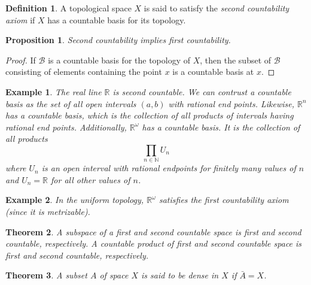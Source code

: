 \documentclass{article}
\newtheorem{theorem}{Theorem}[section]
\newtheorem{proposition}[theorem]{Proposition}
\newtheorem{example}{Example}[section]
\theoremstyle{remark}
\theoremstyle{definition}
\newtheorem{definition}{Definition}[section]
\begin{document}
\begin{definition}
A topological space $X$ is said to satisfy the \textit{second countability axiom} if $X$ has a countable basis for its topology.
\end{definition}

\begin{proposition}
Second countability implies first countability. 
\end{proposition}
\begin{proof}
If $\mathscr{B}$ is a countable basis for the topology of $X$, then the subset of $\mathscr{B}$ consisting of elements containing the point $x$ is a countable basis at $x$. 
\end{proof}

\begin{example}
The real line $\mathbb{R}$ is second countable. We can contrust a countable basis as the set of all open intervals $(a, b)$ with rational end points. Likewise, $\mathbb{R}^n$ has a countable basis, which is the collection of all products of intervals having rational end points. Additionally, $\mathbb{R}^\omega$ has a countable basis. It is the collection of all products
\[\prod_{n \in \mathbb{N}} U_n\]
where $U_n$ is an open interval with rational endpoints for finitely many values of $n$ and $U_n = \mathbb{R}$ for all other values of $n$. 
\end{example}

\begin{example}
In the uniform topology, $\mathbb{R}^\omega$ satisfies the first countability axiom (since it is metrizable). 
\end{example}

\begin{theorem}
A subspace of a first and second countable space is first and second countable, respectively. A countable product of first and second countable space is first and second countable, respectively. 
\end{theorem}

\begin{theorem}
A subset $A$ of space $X$ is said to be \textit{dense} in $X$ if $\bar{A} = X$. 
\end{theorem}
\end{document}
